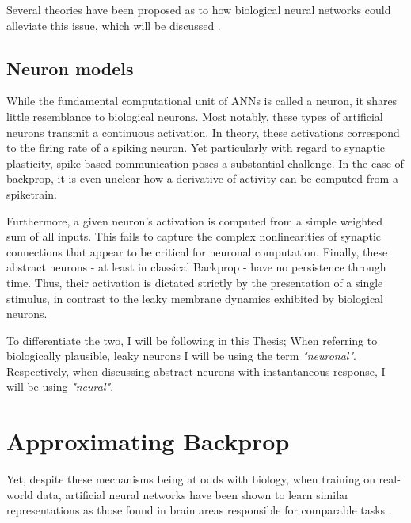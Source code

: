 Several theories have been proposed as to how biological neural networks could alleviate this issue, which will be
discussed .

\subsection*{Neuron models}

While the fundamental computational unit of ANNs is called a neuron, it shares little resemblance to biological neurons.
Most notably, these types of artificial neurons transmit a continuous activation. In theory, these activations correspond
to the firing rate of a spiking neuron. Yet particularly with regard to synaptic plasticity, spike based communication
poses a substantial challenge. In the case of backprop, it is even unclear how a derivative of activity can be computed
from a spiketrain.

Furthermore, a given neuron's activation is computed from a simple weighted sum of all inputs. This fails to capture the
complex nonlinearities of synaptic connections that appear to be critical for neuronal computation. Finally, these
abstract neurons - at least in classical Backprop - have no persistence through time. Thus, their activation is dictated
strictly by the presentation of a single stimulus, in contrast to the leaky membrane dynamics exhibited by biological
neurons.

To differentiate the two, I will be following \cite{Haider2021} in this Thesis; When referring to biologically
plausible, leaky neurons I will be using the term \textit{"neuronal"}. Respectively, when discussing abstract neurons with
instantaneous response, I will be using \textit{"neural"}.







\section{Approximating Backprop}


Yet, despite these mechanisms being at odds with biology, when training on real-world data, artificial neural networks
have been shown to learn similar representations as those found in brain areas responsible for comparable tasks
\cite{whittington2019theories,Yamins2016}.

